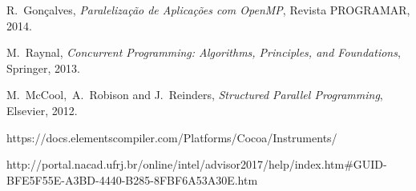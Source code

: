\documentclass[10pt,journal,compsoc]{IEEEtran}
\begin{document}
\ifCLASSOPTIONcaptionsoff
  \newpage
\fi

\begin{thebibliography}{10}

R.~Gonçalves, \emph{Paralelização de Aplicações com OpenMP}, Revista PROGRAMAR, 2014.
  
M.~Raynal, \emph{Concurrent Programming: Algorithms, Principles, and Foundations}, Springer, 2013.

M.~McCool,~A.~Robison and J.~Reinders, \emph{Structured Parallel Programming}, Elsevier, 2012.

https://docs.elementscompiler.com/Platforms/Cocoa/Instruments/

http://portal.nacad.ufrj.br/online/intel/advisor2017/help/index.htm\#GUID-BFE5F55E-A3BD-4440-B285-8FBF6A53A30E.htm

\end{thebibliography}
  
\end{document}

